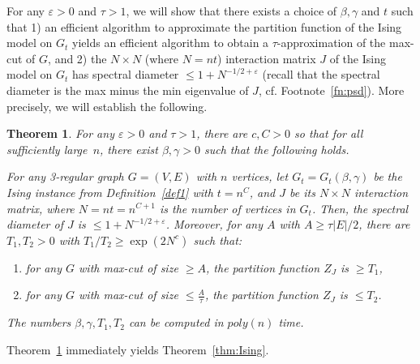 \documentclass[11pt]{article}
\newtheorem{theorem}{Theorem}
\newcommand{\eps}{\varepsilon}
\begin{document}
For any $\eps>0$ and $\tau>1$, we will show that there exists a choice of $\beta, \gamma$ and $t$ such that 
1) an efficient algorithm to approximate the partition function of the Ising model on $G_t$  yields an efficient algorithm to obtain a $\tau$-approximation of the max-cut of $G$, and 
2) the $N\times N$ (where $N=nt$) interaction matrix $J$ of the Ising model on $G_t$ has spectral diameter $\leq  1 + N^{-1/2+\eps}$ (recall that the spectral diameter is the max minus the min eigenvalue of $J$, cf. Footnote~\ref{fn:psd}). More precisely, we will establish the following.


\begin{theorem}\label{TMAIN}
For any $\eps>0$ and $\tau>1$, there are $c,C>0$ so that for all  sufficiently large~$n$, there exist $\beta,\gamma>0$ such that the following holds. 

For any 3-regular graph  $G=(V,E)$ with $n$ vertices, let $G_t=G_t(\beta,\gamma)$ be the Ising instance from Definition~\ref{def1} with $t=n^C$, and $J$ be its $N\times N$ interaction matrix, where $N=n t = n^{C+1}$ is the number of vertices in $G_t$. Then, the spectral diameter of  $J$ is $\leq 1 + N^{-1/2+\eps}$. Moreover, for any $A$ with  $A\geq \tau |E|/2$,   there are $T_1,T_2>0$ with $T_1/T_2\geq \exp(2N^c)$ such that:\vspace{-0.15cm}
\begin{enumerate}
\itemsep0em 
\item for any $G$ with max-cut of size $\geq A$, the partition function $Z_J$ is $\geq T_1$, 
\item for any $G$ with max-cut of size $\leq \tfrac{A}{\tau}$, the partition function $Z_J$  is $\leq T_2$.
\end{enumerate}\vspace{-0.1cm}
The numbers $\beta,\gamma,T_1,T_2$ can be computed in $poly(n)$ time.
\end{theorem}


Theorem~\ref{TMAIN} immediately yields Theorem~\ref{thm:Ising}.
\end{document}
